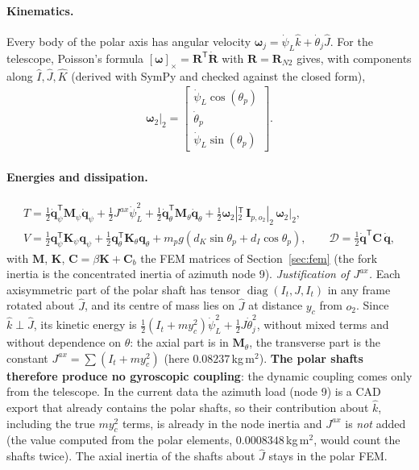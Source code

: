 \documentclass[10pt,a4paper]{article}
\numberwithin{equation}{section}
\begin{document}
\paragraph{Kinematics.} Every body of the polar axis has angular velocity $\boldsymbol\omega_j = \dot\psi_L\hat k + \dot\theta_j\hat J$. For the telescope, Poisson's formula $[\boldsymbol\omega]_\times = \mathbf R^{\mathsf T}\dot{\mathbf R}$ with $\mathbf R = \mathbf R_{N2}$ gives, with components along $\hat I, \hat J, \hat K$ (derived with SymPy and checked against the closed form),
\begin{gather}
\boldsymbol\omega_2\big|_2 = \left[\begin{matrix}\dot{\psi}_L \cos{\left(\theta_{p} \right)}\\\dot{\theta}_p\\\dot{\psi}_L \sin{\left(\theta_{p} \right)}\end{matrix}\right].
\end{gather}
\paragraph{Energies and dissipation.}
\begin{gather}
T = \tfrac12\dot{\mathbf q}_\psi^{\mathsf T}\mathbf M_{\psi}\dot{\mathbf q}_\psi + \tfrac12 J^{ax}\dot\psi_L^2 + \tfrac12\dot{\mathbf q}_\theta^{\mathsf T}\mathbf M_{\theta}\dot{\mathbf q}_\theta + \tfrac12\boldsymbol\omega_2|_2^{\mathsf T}\,\mathbf I_{p,o_2}|_2\,\boldsymbol\omega_2|_2, \\
V = \tfrac12\mathbf q_\psi^{\mathsf T}\mathbf K_{\psi}\mathbf q_\psi + \tfrac12\mathbf q_\theta^{\mathsf T}\mathbf K_{\theta}\mathbf q_\theta + m_p g\left(d_K\sin\theta_p + d_I\cos\theta_p\right),\qquad \mathcal D = \tfrac12\dot{\mathbf q}^{\mathsf T}\mathbf C\,\dot{\mathbf q},
\end{gather}
with $\mathbf M$, $\mathbf K$, $\mathbf C = \beta\mathbf K + \mathbf C_b$ the FEM matrices of Section~\ref{sec:fem} (the fork inertia is the concentrated inertia of azimuth node 9).
\emph{Justification of $J^{ax}$.} Each axisymmetric part of the polar shaft has tensor $\operatorname{diag}(I_t, J, I_t)$ in any frame rotated about $\hat J$, and its centre of mass lies on $\hat J$ at distance $y_c$ from $o_2$. Since $\hat k\perp\hat J$, its kinetic energy is $\tfrac12(I_t + m y_c^2)\dot\psi_L^2 + \tfrac12 J\dot\theta_j^2$, without mixed terms and without dependence on $\theta$: the axial part is in $\mathbf M_\theta$, the transverse part is the constant $J^{ax} = \sum(I_t + m y_c^2)$ (here $0.08237$\,kg\,m$^2$). \textbf{The polar shafts therefore produce no gyroscopic coupling}: the dynamic coupling comes only from the telescope. In the current data the azimuth load (node 9) is a CAD export that already contains the polar shafts, so their contribution about $\hat k$, including the true $m y_c^2$ terms, is already in the node inertia and $J^{ax}$ is \emph{not} added (the value computed from the polar elements, $0.0008348$\,kg\,m$^2$, would count the shafts twice). The axial inertia of the shafts about $\hat J$ stays in the polar FEM.
\end{document}
